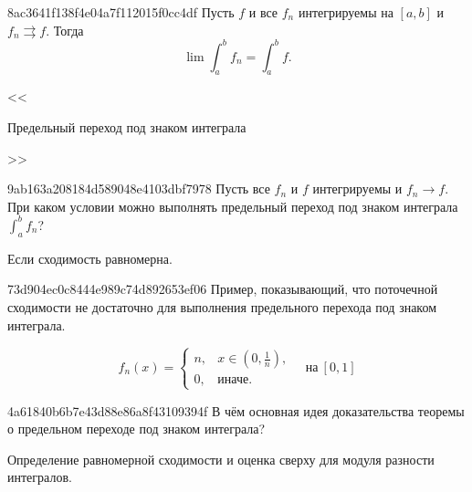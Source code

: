 \begin{note}{8ac3641f138f4e04a7f112015f0cc4df}
    Пусть \({ f }\) и все \({ f_n }\) интегрируемы на \({ [a, b] }\) и \({ f_n \rightrightarrows f }\).
    Тогда
    \[
        \lim \int_{a}^{b} f_n = \int_{a}^{b} f.
    \]

    \begin{center}
        \tiny
        <<\begin{icloze}{1}Предельный переход под знаком интеграла\end{icloze}>>
    \end{center}
\end{note}

\begin{note}{9ab163a208184d589048e4103dbf7978}
    Пусть все \({ f_n }\) и \({ f }\) интегрируемы и \({ f_n \to f }\).
    При каком условии можно выполнять предельный переход под знаком интеграла \({ \int_{a}^{b} f_n }\)?

    \begin{cloze}{1}
        Если сходимость равномерна.
    \end{cloze}
\end{note}

\begin{note}{73d904ec0c8444e989c74d892653ef06}
    Пример, показывающий, что поточечной сходимости не достаточно для выполнения предельного перехода под знаком интеграла.

    \begin{cloze}{1}
        \[
            f_n(x) = \begin{cases}
                n, & x \in (0, \frac{1}{n}), \\
                0, & \text{иначе}.
            \end{cases}
            \quad \text{на}\ [0, 1]
        \]
    \end{cloze}
\end{note}

\begin{note}{4a61840b6b7e43d88e86a8f43109394f}
    В чём основная идея доказательства теоремы о предельном переходе под знаком интеграла?

    \begin{cloze}{1}
        Определение равномерной сходимости и оценка сверху для модуля разности интегралов.
    \end{cloze}
\end{note}


